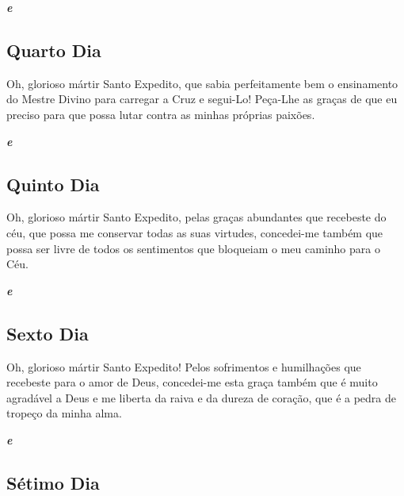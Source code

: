 \documentclass[18pt]{article}
\begin{document}
\begin{justify}
\textbf{\textit{ e }} %

\subsection*{Quarto Dia}

\textbf{\textit{}} %

Oh, glorioso mártir Santo Expedito, que sabia perfeitamente bem o ensinamento do Mestre Divino para carregar a Cruz e segui-Lo! Peça-Lhe as graças de que eu preciso para que possa lutar contra as minhas próprias paixões.

\textbf{\textit{ e }} %

\subsection*{Quinto Dia}

\textbf{\textit{}} %

Oh, glorioso mártir Santo Expedito, pelas graças abundantes que recebeste do céu, que possa me conservar todas as suas virtudes, concedei-me também que possa ser livre de todos os sentimentos que bloqueiam o meu caminho para o Céu.

\textbf{\textit{ e }} %

\subsection*{Sexto Dia}

\textbf{\textit{}} %

Oh, glorioso mártir Santo Expedito! Pelos sofrimentos e humilhações que recebeste para o amor de Deus, concedei-me esta graça também que é muito agradável a Deus e me liberta da raiva e da dureza de coração, que é a pedra de tropeço da minha alma.

\textbf{\textit{ e }} %

\subsection*{Sétimo Dia}

\textbf{\textit{}} %


\end{justify}
\end{document}
